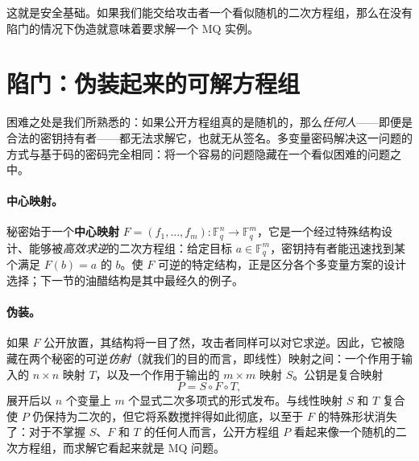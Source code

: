 这就是安全基础。如果我们能交给攻击者一个看似随机的二次方程组，那么在没有陷门的情况下伪造就意味着要求解一个 MQ 实例。

\section{陷门：伪装起来的可解方程组}

困难之处是我们所熟悉的：如果公开方程组真的是随机的，那么\emph{任何人}——即便是合法的密钥持有者——都无法求解它，也就无从签名。多变量密码解决这一问题的方式与基于码的密码完全相同：将一个容易的问题隐藏在一个看似困难的问题之中。

\paragraph{中心映射。}
秘密始于一个\textbf{中心映射} $F = (f_1,\dots,f_m) : \mathbb{F}_q^n \to \mathbb{F}_q^m$，它是一个经过特殊结构设计、能够被\emph{高效求逆}的二次方程组：给定目标 $a \in \mathbb{F}_q^m$，密钥持有者能迅速找到某个满足 $F(b) = a$ 的 $b$。使 $F$ 可逆的特定结构，正是区分各个多变量方案的设计选择；下一节的油醋结构是其中最经久的例子。

\paragraph{伪装。}
如果 $F$ 公开放置，其结构将一目了然，攻击者同样可以对它求逆。因此，它被隐藏在两个秘密的可逆\emph{仿射}（就我们的目的而言，即线性）映射之间：一个作用于输入的 $n \times n$ 映射 $T$，以及一个作用于输出的 $m \times m$ 映射 $S$。公钥是复合映射
\[
P = S \circ F \circ T ,
\]
展开后以 $n$ 个变量上 $m$ 个显式二次多项式的形式发布。与线性映射 $S$ 和 $T$ 复合使 $P$ 仍保持为二次的，但它将系数搅拌得如此彻底，以至于 $F$ 的特殊形状消失了：对于不掌握 $S$、$F$ 和 $T$ 的任何人而言，公开方程组 $P$ 看起来像一个随机的二次方程组，而求解它看起来就是 MQ 问题。

